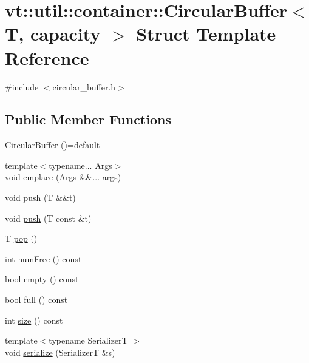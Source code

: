 \hypertarget{structvt_1_1util_1_1container_1_1_circular_buffer}{}\section{vt\+:\+:util\+:\+:container\+:\+:Circular\+Buffer$<$ T, capacity $>$ Struct Template Reference}
\label{structvt_1_1util_1_1container_1_1_circular_buffer}


{\ttfamily \#include $<$circular\+\_\+buffer.\+h$>$}

\subsection*{Public Member Functions}
\begin{DoxyCompactItemize}
\item 
\hyperlink{structvt_1_1util_1_1container_1_1_circular_buffer_a38cfb7731cba8b9276711b18ddedf4e8}{Circular\+Buffer} ()=default
\item 
{\footnotesize template$<$typename... Args$>$ }\\void \hyperlink{structvt_1_1util_1_1container_1_1_circular_buffer_a31bb27eb15a398ba25fbadf4aa0f2b58}{emplace} (Args \&\&... args)
\item 
void \hyperlink{structvt_1_1util_1_1container_1_1_circular_buffer_a3abb7bc0fe6fc2989e042a817822d56a}{push} (T \&\&t)
\item 
void \hyperlink{structvt_1_1util_1_1container_1_1_circular_buffer_ad5f6b5a0351e64b8dd0929a9a67157a0}{push} (T const \&t)
\item 
T \hyperlink{structvt_1_1util_1_1container_1_1_circular_buffer_aa35da044d0a91356040a531776d4ae61}{pop} ()
\item 
int \hyperlink{structvt_1_1util_1_1container_1_1_circular_buffer_aee95bce7a967bf98e3190db8f62a5f76}{num\+Free} () const
\item 
bool \hyperlink{structvt_1_1util_1_1container_1_1_circular_buffer_a856c48e3984ef0d66d595d303fc5ff99}{empty} () const
\item 
bool \hyperlink{structvt_1_1util_1_1container_1_1_circular_buffer_af528f4f242956508ea90b942246d2325}{full} () const
\item 
int \hyperlink{structvt_1_1util_1_1container_1_1_circular_buffer_a38d1a449f1b3d374a96e7c61275980e5}{size} () const
\item 
{\footnotesize template$<$typename SerializerT $>$ }\\void \hyperlink{structvt_1_1util_1_1container_1_1_circular_buffer_abe281a81a9c63e24ce30c553cdc57ab8}{serialize} (SerializerT \&s)
\end{DoxyCompactItemize}
